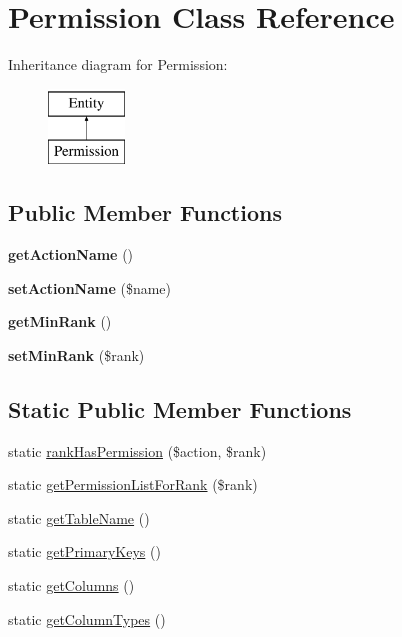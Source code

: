 \hypertarget{classPermission}{
\section{Permission Class Reference}
\label{classPermission}
}
Inheritance diagram for Permission:\begin{figure}[H]
\begin{center}
\leavevmode
\includegraphics[height=2.000000cm]{classPermission}
\end{center}
\end{figure}
\subsection*{Public Member Functions}
\begin{DoxyCompactItemize}
\item 
\hypertarget{classPermission_a0c1a23daf6f499100c92dcbbcef05416}{
{\bfseries getActionName} ()}
\label{classPermission_a0c1a23daf6f499100c92dcbbcef05416}

\item 
\hypertarget{classPermission_a0c35c0690e810975dab77df52ca619e6}{
{\bfseries setActionName} (\$name)}
\label{classPermission_a0c35c0690e810975dab77df52ca619e6}

\item 
\hypertarget{classPermission_a02f2ba7b284c068c0afde0fb92a9cd28}{
{\bfseries getMinRank} ()}
\label{classPermission_a02f2ba7b284c068c0afde0fb92a9cd28}

\item 
\hypertarget{classPermission_a7e6d42d69b97d2081c079b965ee0aa08}{
{\bfseries setMinRank} (\$rank)}
\label{classPermission_a7e6d42d69b97d2081c079b965ee0aa08}

\end{DoxyCompactItemize}
\subsection*{Static Public Member Functions}
\begin{DoxyCompactItemize}
\item 
static \hyperlink{classPermission_aaa1ea30e31b0e60dd30231e43b0af3aa}{rankHasPermission} (\$action, \$rank)
\item 
static \hyperlink{classPermission_abcffffde78f2430545cdbe63369928b9}{getPermissionListForRank} (\$rank)
\item 
static \hyperlink{classPermission_a9a6694ebca8793f08c3f3388c27e0645}{getTableName} ()
\item 
static \hyperlink{classPermission_a378dfdccb2df0e6d2b7bb059cd918873}{getPrimaryKeys} ()
\item 
static \hyperlink{classPermission_ac2a9a31fc731c58daa3b0b9385ec03fb}{getColumns} ()
\item 
static \hyperlink{classPermission_a0040cda21f71bbcdf478c9e8f1996d6d}{getColumnTypes} ()
\end{DoxyCompactItemize}

